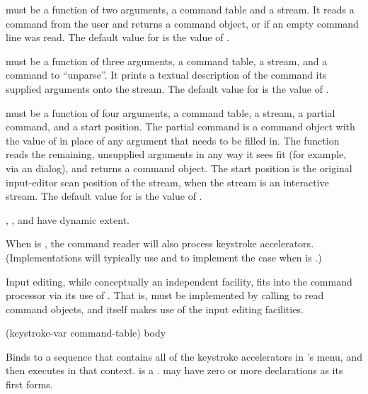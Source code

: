 must be a function of two arguments, a command table and a
stream.  It reads a command from the user and returns a command object, or
 if an empty command line was read.  The default value for
 is the value of .

 must be a function of three arguments, a command table, a
stream, and a command to ``unparse''.  It prints a textual description of the
command its supplied arguments onto the stream.  The default value for
 is the value of .

 must be a function of four arguments, a command
table, a stream, a partial command, and a start position.  The partial command
is a command object with the value of  in place
of any argument that needs to be filled in.  The function reads the remaining,
unsupplied arguments in any way it sees fit (for example, via an
 dialog), and returns a command object.  The start position
is the original input-editor scan position of the stream, when the stream is an
interactive stream.  The default value for  is the
value of .

, , and 
have dynamic extent.

When  is , the command reader will also process
keystroke accelerators.  (Implementations will typically use
 and  to
implement the case when  is .)

Input editing, while conceptually an independent facility, fits into the command
processor via its use of .  That is,  must be
implemented by calling  to read command objects, and 
itself makes use of the input editing facilities.


 {(keystroke-var command-table) \body body}

Binds  to a sequence that contains all of the keystroke
accelerators in 's menu, and then executes  in that
context.   is a .  
may have zero or more declarations as its first forms.

